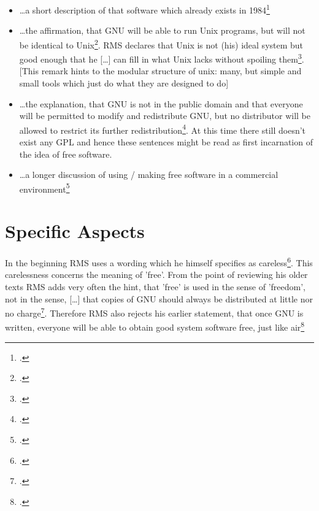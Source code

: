 \documentclass[DIV=calc,BCOR=5mm,11pt,headings=small,oneside,abstract=true, toc=bib]{scrartcl}
\begin{document}
\begin{itemize}
  \item \ldots a short description of that software which already exists in
  1984\footcite[cf.][31]{Stallman1984a}
  \item \ldots the affirmation, that \glqq{}GNU will be able to run Unix
  programs, but will not be identical to
  Unix\grqq{}\footcite[cf.][31]{Stallman1984a}. RMS declares that Unix is
  \glqq{}not (his) ideal system\grqq{} but good enough that he \glqq{}[\ldots]
  can fill in what Unix lacks without spoiling
  them\grqq{}\footcite[cf.][32]{Stallman1984a}. [This remark hints to the
  modular structure of unix: many, but simple and small tools which just do what
  they are designed to do]
  \item \ldots the explanation, that \glqq{}GNU is not in the public
  domain\grqq{} and that \glqq{}everyone will be permitted to modify and
  redistribute GNU, but no distributor will be allowed to restrict its
  further redistribution\grqq{}\footcite[cf.][32]{Stallman1984a}. At this time
  there still doesn't exist any GPL and hence these sentences might be read as
  first incarnation of the idea of free software.
  \item \ldots a longer discussion of using / making free software in a
  commercial environment\footcite[cf.][34ff]{Stallman1984a}
\end{itemize}

\section{Specific Aspects}

In the beginning RMS uses a wording which he himself specifies as
\glqq{}careless\grqq{}\footcite[cf.][31, FN 1]{Stallman1984a}. This carelessness
concerns the meaning of 'free'. From the point of reviewing his older texts RMS
adds very often the hint, that 'free' is used in the sense of 'freedom', not in
the sense, \glqq{}[\ldots] that copies of GNU should always be
distributed at little nor no charge\grqq{}\footcite[cf.][31, FN
1]{Stallman1984a}. Therefore RMS also rejects his earlier statement, that
\glqq{}once GNU is written, everyone will be able to obtain good system
software free, just like air\grqq{}\footcite[cf.][34]{Stallman1984a}
\small

\end{document}

